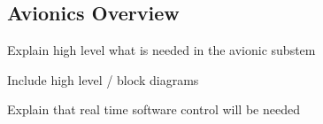 \subsection{Avionics Overview}

Explain high level what is needed in the avionic substem

Include high level / block diagrams

Explain that real time software control will be needed
